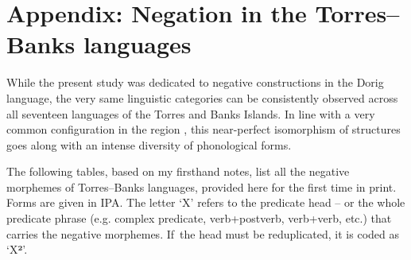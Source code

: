 \documentclass[output=paper,colorlinks,citecolor=brown,draft]{langscibook}
\begin{document}
\sloppy\printbibliography[heading=subbibliography,notkeyword=this]


\section*{Appendix: Negation in the Torres–Banks languages}\label{sec:dor:6}




While the present study was dedicated to negative constructions in the Dorig language, the very same linguistic categories can be consistently observed across all seventeen languages of the Torres and Banks Islands. In line with a very common configuration in the region \citep{François2011}, this near-perfect isomorphism of structures goes along with an intense diversity of phonological forms.


The following tables, based on my firsthand notes, list all the negative morphemes of Torres–Banks languages, provided here for the first time in print. Forms are given in IPA. The letter ‘X’ refers to the predicate head – or the whole predicate phrase (e.g. complex predicate, verb+postverb, verb+verb, etc.) that carries the negative morphemes. If~the head must be reduplicated, it is coded as ‘X\textbf{²}’.
\end{document}
